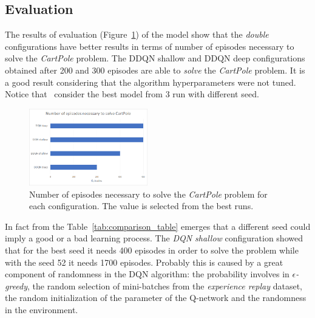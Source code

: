 \subsection{Evaluation}

The results of evaluation (Figure~\ref{fig:comparison}) of the model show that the \textit{double} configurations have better results in terms of number of episodes necessary to solve the \textit{CartPole} problem. The DDQN shallow and DDQN deep configurations obtained after 200 and 300 episodes are able to \textit{solve} the \textit{CartPole} problem. It is a good result considering that the algorithm hyperparameters were not tuned. Notice that \auth~consider the best model from 3 run with different seed. 

\begin{figure}[t]
	\centering
	\includegraphics[width=0.46\textwidth]{res/Comparison}
	\caption{Number of episodes necessary to solve the \textit{CartPole} problem for each configuration. The value is selected from the best runs.}
	\label{fig:comparison}
\end{figure}

In fact from the Table~\ref{tab:comparison_table} emerges that a different seed could imply a good or a bad learning process. The \textit{DQN shallow} configuration showed that for the best seed it needs 400 episodes in order to solve the problem while with the seed 52 it needs 1700 episodes. Probably this is caused by a great component of randomness in the DQN algorithm: the probability involves in \textit{$\epsilon$-greedy}, the random selection of mini-batches from the \textit{experience replay} dataset, the random initialization of the parameter of the Q-network and the randomness in the environment.


